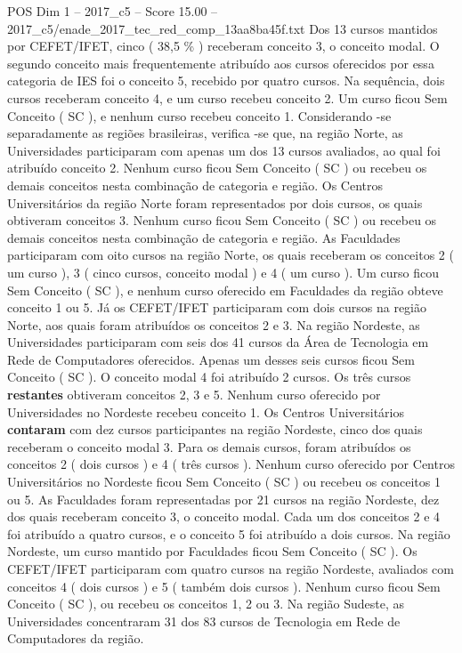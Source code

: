 \begin{textsample}{POS Dim 1 – 2017\_c5 – Score 15.00 – 2017\_c5/enade\_2017\_tec\_red\_comp\_13aa8ba45f.txt}
Dos 13 cursos mantidos por CEFET/IFET, cinco ( 38,5 \% ) receberam conceito 3, o conceito modal.
O segundo conceito mais frequentemente atribuído aos cursos oferecidos por essa categoria de IES foi o conceito 5, recebido por quatro cursos.
Na sequência, dois cursos receberam conceito 4, e um curso recebeu conceito 2.
Um curso ficou Sem Conceito ( SC ), e nenhum curso recebeu conceito 1.
Considerando -se separadamente as regiões brasileiras, verifica -se que, na região Norte, as Universidades participaram com apenas um dos 13 cursos avaliados, ao qual foi atribuído conceito 2.
Nenhum curso ficou Sem Conceito ( SC ) ou recebeu os demais conceitos nesta combinação de categoria e região.
Os Centros Universitários da região Norte foram representados por dois cursos, os quais obtiveram conceitos 3.
Nenhum curso ficou Sem Conceito ( SC ) ou recebeu os demais conceitos nesta combinação de categoria e região.
As Faculdades participaram com oito cursos na região Norte, os quais receberam os conceitos 2 ( um curso ), 3 ( cinco cursos, conceito modal ) e 4 ( um curso ).
Um curso ficou Sem Conceito ( SC ), e nenhum curso oferecido em Faculdades da região obteve conceito 1 ou 5.
Já os CEFET/IFET participaram com dois cursos na região Norte, aos quais foram atribuídos os conceitos 2 e 3.
Na região Nordeste, as Universidades participaram com seis dos 41 cursos da Área de Tecnologia em Rede de Computadores oferecidos.
Apenas um desses seis cursos ficou Sem Conceito ( SC ).
O conceito modal 4 foi atribuído 2 cursos.
Os três cursos \textbf{restantes} obtiveram conceitos 2, 3 e 5.
Nenhum curso oferecido por Universidades no Nordeste recebeu conceito 1.
Os Centros Universitários \textbf{contaram} com dez cursos participantes na região Nordeste, cinco dos quais receberam o conceito modal 3.
Para os demais cursos, foram atribuídos os conceitos 2 ( dois cursos ) e 4 ( três cursos ).
Nenhum curso oferecido por Centros Universitários no Nordeste ficou Sem Conceito ( SC ) ou recebeu os conceitos 1 ou 5.
As Faculdades foram representadas por 21 cursos na região Nordeste, dez dos quais receberam conceito 3, o conceito modal.
Cada um dos conceitos 2 e 4 foi atribuído a quatro cursos, e o conceito 5 foi atribuído a dois cursos.
Na região Nordeste, um curso mantido por Faculdades ficou Sem Conceito ( SC ).
Os CEFET/IFET participaram com quatro cursos na região Nordeste, avaliados com conceitos 4 ( dois cursos ) e 5 ( também dois cursos ).
Nenhum curso ficou Sem Conceito ( SC ), ou recebeu os conceitos 1, 2 ou 3.
Na região Sudeste, as Universidades concentraram 31 dos 83 cursos de Tecnologia em Rede de Computadores da região.

\end{textsample}
